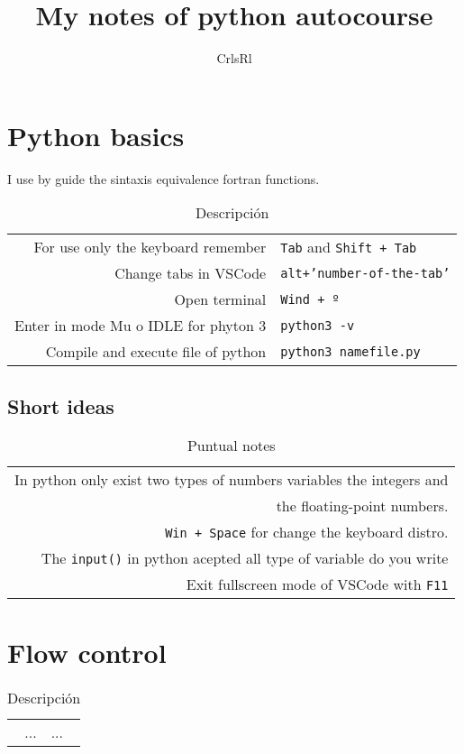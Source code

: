\documentclass[12pt,letterpaper]{article}
\author{CrlsRl}
\title{My notes of python autocourse }
\begin{document}
\maketitle
\section{Python basics}
I use by guide the sintaxis equivalence fortran functions.
\begin{table}[h!]
  \centering
  \begin{tabular}{r|l}
    For use only the keyboard remember& \texttt{Tab} and \texttt{Shift + Tab}\\
    Change tabs in VSCode & \texttt{alt+'number-of-the-tab'} \\
    Open terminal & \texttt{Wind + º}\\
    Enter in mode Mu o IDLE for phyton 3 & \texttt{python3 -v} \\
    Compile and execute file of python & \texttt{python3 namefile.py} \\

  \end{tabular}
  \caption{Descripción}
\end{table}
\subsection{Short ideas}
\begin{table}[h!]
  \centering
  \begin{tabular}{r}
    In python only exist two types of numbers variables the integers and\\ the floating-point numbers.\\
    \texttt{Win + Space} for change the keyboard distro.\\
    The \texttt{input()} in python acepted all type of variable do you write\\ 
    Exit fullscreen mode of VSCode with \texttt{F11}
  \end{tabular}
  \caption{Puntual notes}
\end{table}
\section{Flow control}
\begin{table}[h!]
  \centering
  \begin{tabular}{r|l}
    ... & ...
  \end{tabular}
  \caption{Descripción}
\end{table}
\end{document}
